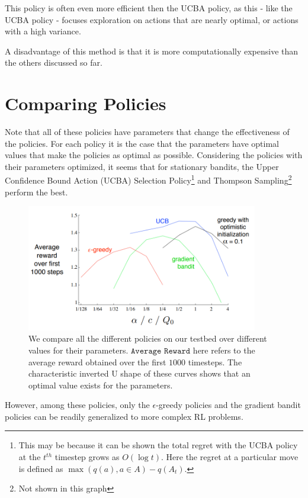 \documentclass[12pt]{report}
\begin{document}
This policy is often even more efficient then the UCBA policy, as this - like the UCBA policy - focuses exploration on actions that are nearly optimal, or actions with a high variance.

A disadvantage of this method is that it is more computationally expensive than the others discussed so far.

\section{Comparing Policies}
Note that all of these policies have parameters that change the effectiveness of the policies. For each policy it is the case that the parameters have optimal values that make the policies as optimal as possible.
Considering the policies with their parameters optimized, it seems that for stationary bandits, the Upper Confidence Bound Action (UCBA) Selection Policy\footnote{This may be because it can be shown the total regret with the UCBA policy at the $t^{th}$ timestep grows as $O(\log t)$. Here the regret at a particular move is defined as $\max(q(a), a \in A) - q(A_{t})$.} and Thompson Sampling\footnote{Not shown in this graph} perform the best. 

\begin{figure}[h!]
    \centering
    \includegraphics[width=0.9\textwidth]{images/compare-bandit.png}
    \caption{We compare all the different policies on our testbed over different values for their parameters. $\texttt{Average Reward}$ here refers to the average reward obtained over the first $1000$ timesteps. The characteristic inverted U shape of these curves shows that an optimal value exists for the parameters.}
\end{figure}

However, among these policies, only the $\epsilon$-greedy policies and the gradient bandit policies can be readily generalized to more complex RL problems.
\end{document}
